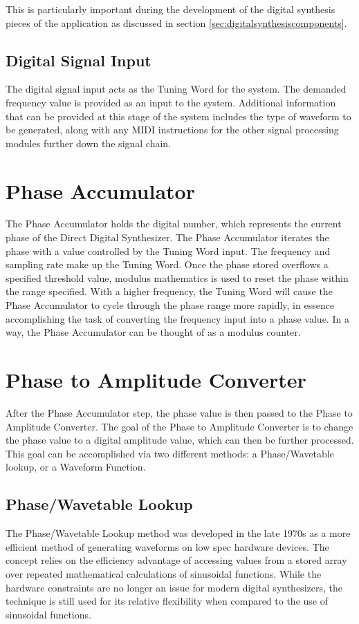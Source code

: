 \documentclass[a4paper,12pt]{report}
\begin{document}
This is particularly important during the development of the digital synthesis pieces of the application as discussed in section \ref{sec:digitalsynthesiscomponents}.

\subsection{Digital Signal Input}
\label{subsec:digitalsignalinput}
The digital signal input acts as the Tuning Word for the system. The demanded frequency value is provided as an input to the system. Additional information that can be provided at this stage of the system includes the type of waveform to be generated, along with any MIDI instructions for the other signal processing modules further down the signal chain.

\section{Phase Accumulator}
\label{sec:phaseaccu}
The Phase Accumulator holds the digital number, which represents the current phase of the Direct Digital Synthesizer. The Phase Accumulator iterates the phase with a value controlled by the Tuning Word input. The frequency and sampling rate make up the Tuning Word. Once the phase stored overflows a specified threshold value, modulus mathematics is used to reset the phase within the range specified. With a higher frequency, the Tuning Word will cause the Phase Accumulator to cycle through the phase range more rapidly, in essence accomplishing the task of converting the frequency input into a phase value. In a way, the Phase Accumulator can be thought of as a modulus counter.

\section{Phase to Amplitude Converter}
\label{sec:phasetoamplitudeconverter}
After the Phase Accumulator step, the phase value is then passed to the Phase to Amplitude Converter. The goal of the Phase to Amplitude Converter is to change the phase value to a digital amplitude value, which can then be further processed. This goal can be accomplished via two different methods: a Phase/Wavetable lookup, or a Waveform Function.

\subsection{Phase/Wavetable Lookup}
\label{subsec:phasewavetablelookup}
The Phase/Wavetable Lookup method was developed in the late 1970s as a more efficient method of generating waveforms on low spec hardware devices. The concept relies on the efficiency advantage of accessing values from a stored array over repeated mathematical calculations of sinusoidal functions. While the hardware constraints are no longer an issue for modern digital synthesizers, the technique is still used for its relative flexibility when compared to the use of sinusoidal functions.
\end{document}

